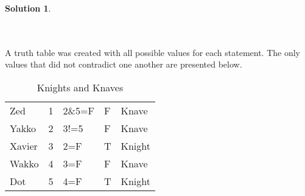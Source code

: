 \documentclass{article}
\theoremstyle{definition}
\newtheorem*{solution}{Solution}
\begin{document}
\begin{solution}
\begin{compactenum}\ \\
\ \\
A truth table was created with all possible values for each statement. The only values that did not contradict one another are presented below.
\end{compactenum}
\begin{table}[htbp]
  \centering
  \caption{Knights and Knaves}
    \begin{tabular}{|l|r|l|l|l|}
    \hline
    Zed   & 1     & 2\&5=F & F     & Knave \\
    Yakko & 2     & 3!=5  & F     & Knave \\
    Xavier & 3     & 2=F   & T     & Knight \\
    Wakko & 4     & 3=F   & F     & Knave \\
    Dot   & 5     & 4=F   & T     & Knight \\
    \hline
    \end{tabular}%
  \label{tab:addlabel}%
\end{table}%


\end{solution}
\end{document}

